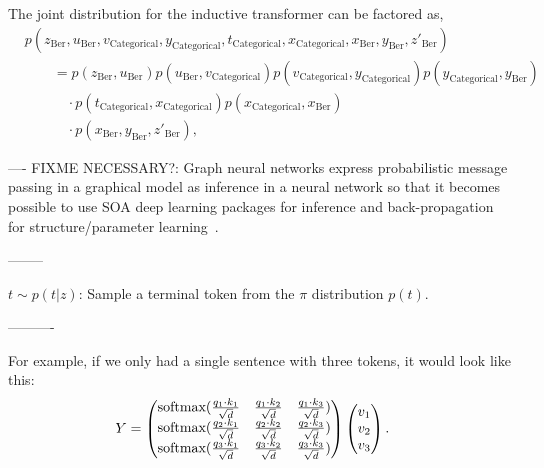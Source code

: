 The joint distribution for the inductive transformer can be factored as, 
\begin{align}\label{eq:inductive-transformer-joint-distribution}
    &p(z_{\text{Ber}}, u_{\text{Ber}}, v_{\text{Categorical}}, y_{\text{Categorical}}, t_{\text{Categorical}}, x_{\text{Categorical}}, x_{\text{Ber}}, y_{\text{Ber}}, z'_{\text{Ber}}) \nonumber \\
    &\quad\quad = p(z_{\text{Ber}}, u_{\text{Ber}})p( u_{\text{Ber}},v_{\text{Categorical}}) p(v_{\text{Categorical}}, y_{\text{Categorical}})
    p(y_{\text{Categorical}}, y_{\text{Ber}}) \nonumber \\
    &\quad\quad\quad \cdot p( t_{\text{Categorical}}, x_{\text{Categorical}})
    p(x_{\text{Categorical}}, x_{\text{Ber}}) \nonumber \\
    &\quad\quad\quad \cdot p(x_{\text{Ber}}, y_{\text{Ber}}, z'_{\text{Ber}}),
\end{align}

----
FIXME NECESSARY?: Graph neural networks express probabilistic message passing in a graphical model as inference in a neural network so that it becomes possible to use SOA deep learning packages for inference and back-propagation for structure/parameter learning~\cite{DBLP:journals/corr/abs-1901-00596}.

--------
 

    \item $t \sim p(t|z)$: Sample a terminal token from the $\pi$ distribution $p(t)$.
    
----------

For example, if we only had a single sentence with three tokens, it would look like this:
\begin{align}
    Y &= \begin{pmatrix}
    \text{softmax}\large(\frac{q_{1} \cdot k_{1}}{\sqrt{d}} & \frac{q_{1} \cdot k_{2}}{\sqrt{d}} & \frac{q_{1} \cdot k_{3}}{\sqrt{d}} \large) \\
    \text{softmax}\large(\frac{q_{2} \cdot k_{1}}{\sqrt{d}} & \frac{q_{2} \cdot k_{2}}{\sqrt{d}} & \frac{q_{2} \cdot k_{3}}{\sqrt{d}} \large) \\
    \text{softmax}\large(\frac{q_{3} \cdot k_{1}}{\sqrt{d}} & \frac{q_{3} \cdot k_{2}}{\sqrt{d}} & \frac{q_{3} \cdot k_{3}}{\sqrt{d}} \large) \\
    \end{pmatrix} \begin{pmatrix}
    v_{1} \\
    v_{2} \\
    v_{3}
    \end{pmatrix}.
\end{align}

